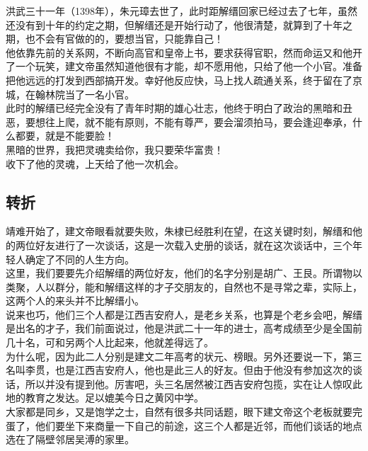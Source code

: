 \begin{multicols}{\theparacolNo}
洪武三十一年（1398年），朱元璋去世了，此时距解缙回家已经过去了七年，虽然还没有到十年的约定之期，但解缙还是开始行动了，他很清楚，就算到了十年之期，也不会有官做的的，要想当官，只能靠自己！\\

他依靠先前的关系网，不断向高官和皇帝上书，要求获得官职，然而命运又和他开了一个玩笑，建文帝虽然知道他很有才能，却不愿用他，只给了他一个小官。准备把他远远的打发到西部搞开发。幸好他反应快，马上找人疏通关系，终于留在了京城，在翰林院当了一名小官。\\

此时的解缙已经完全没有了青年时期的雄心壮志，他终于明白了政治的黑暗和丑恶，要想往上爬，就不能有原则，不能有尊严，要会溜须拍马，要会逢迎奉承，什么都要，就是不能要脸！\\

黑暗的世界，我把灵魂卖给你，我只要荣华富贵！\\

收下了他的灵魂，上天给了他一次机会。\\

\subsection{转折}
靖难开始了，建文帝眼看就要失败，朱棣已经胜利在望，在这关键时刻，解缙和他的两位好友进行了一次谈话，这是一次载入史册的谈话，就在这次谈话中，三个年轻人确定了不同的人生方向。\\

这里，我们要要先介绍解缙的两位好友，他们的名字分别是胡广、王艮。所谓物以类聚，人以群分，能和解缙这样的才子交朋友的，自然也不是寻常之辈，实际上，这两个人的来头并不比解缙小。\\

说来也巧，他们三个人都是江西吉安府人，是老乡关系，也算是个老乡会吧，解缙是出名的才子，我们前面说过，他是洪武二十一年的进士，高考成绩至少是全国前几十名，可和另两个人比起来，他就差得远了。\\

为什么呢，因为此二人分别是建文二年高考的状元、榜眼。另外还要说一下，第三名叫李贯，也是江西吉安府人，他也是此三人的好友。但由于他没有参加这次的谈话，所以并没有提到他。厉害吧，头三名居然被江西吉安府包揽，实在让人惊叹此地的教育之发达。足以媲美今日之黄冈中学。\\

大家都是同乡，又是饱学之士，自然有很多共同话题，眼下建文帝这个老板就要完蛋了，他们要坐下来商量一下自己的前途，这三个人都是近邻，而他们谈话的地点选在了隔壁邻居吴溥的家里。\\


\end{multicols}
